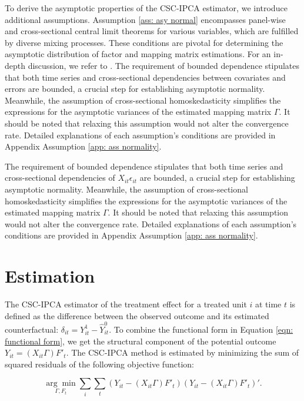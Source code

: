 \documentclass[12pt]{article}
\begin{document}
To derive the asymptotic properties of the CSC-IPCA estimator, we introduce additional assumptions. Assumption \ref{ass: asy normal} encompasses panel-wise and cross-sectional central limit theorems for various variables, which are fulfilled by diverse mixing processes. These conditions are pivotal for determining the asymptotic distribution of factor and mapping matrix estimations. For an in-depth discussion, we refer to \cite{kelly2020instrumented}. The requirement of bounded dependence stipulates that both time series and cross-sectional dependencies between covariates and errors are bounded, a crucial step for establishing asymptotic normality. Meanwhile, the assumption of cross-sectional homoskedasticity simplifies the expressions for the asymptotic variances of the estimated mapping matrix $\Gamma$. It should be noted that relaxing this assumption would not alter the convergence rate. Detailed explanations of each assumption's conditions are provided in Appendix Assumption \ref{app: ass normality}.

The requirement of bounded dependence stipulates that both time series and cross-sectional dependencies of $X_{it}\epsilon_{it}$ are bounded, a crucial step for establishing asymptotic normality. Meanwhile, the assumption of cross-sectional homoskedasticity simplifies the expressions for the asymptotic variances of the estimated mapping matrix $\Gamma$. It should be noted that relaxing this assumption would not alter the convergence rate. Detailed explanations of each assumption's conditions are provided in Appendix Assumption \ref{app: ass normality}.

\section{Estimation}
\label{sec: estimation}
The CSC-IPCA estimator of the treatment effect for a treated unit $i$ at time $t$ is defined as the difference between the observed outcome and its estimated counterfactual: $\delta_{it} = Y_{it}^1 - \hat{Y}_{it}^0$. To combine the functional form in Equation \ref{eqn: functional form}, we get the structural component of the potential outcome $Y_{it} = (X_{it}\Gamma) F'_{t}$. The CSC-IPCA method is estimated by minimizing the sum of squared residuals of the following objective function:

\begin{equation}
\label{eqn: obj}
\underset{\Gamma, F_t}{\arg\min} \sum_{i} \sum_{t}\left( Y_{it} - (X_{it}\Gamma) F'_{t} \right)\left( Y_{it} - (X_{it}\Gamma) F'_{t} \right)'.
\end{equation}
\end{document}
